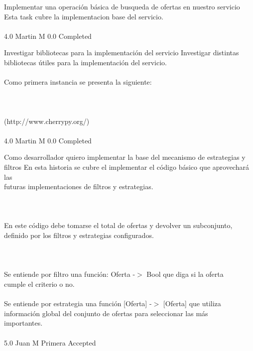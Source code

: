 		{Implementar una operación básica de busqueda de ofertas en nuestro servicio} %
		{Esta task cubre la implementacion base del servicio.\\
\\
} %
		{4.0} %
		{Martin M} %
		{0.0} %
		{Completed} %

		{Investigar bibliotecas para la implementación del servicio} %
		{Investigar distintas bibliotecas útiles para la implementación del servicio.\\
\\
Como primera instancia se presenta la siguiente:\\
\\
  \\
\\
[http://www.cherrypy.org/](http://www.cherrypy.org/)\\
\\
} %
		{4.0} %
		{Martin M} %
		{0.0} %
		{Completed} %


\vspace{20pt}

	{Como desarrollador quiero implementar la base del mecanismo de estrategias y filtros} %
	{En esta historia se cubre el implementar el código básico que aprovechará las\\
futuras implementaciones de filtros y estrategias.\\
\\
  \\
\\
En este código debe tomarse el total de ofertas y devolver un subconjunto,\\
definido por los filtros y estrategias configurados.\\
\\
  \\
\\
Se entiende por filtro una función: Oferta -$>$  Bool que diga si la oferta\\
cumple el criterio o no.\\
\\
Se entiende por estrategia una función [Oferta] -$>$  [Oferta] que utiliza\\
información global del conjunto de ofertas para seleccionar las más\\
importantes.\\
\\
} %
	{} %
	{5.0} %
	{Juan M} %
	{Primera} %
	{Accepted} %

